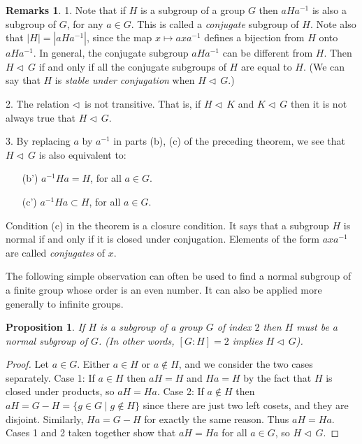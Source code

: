 \documentclass[11pt]{article}
\newtheorem{prop}[thm]{Proposition}
\theoremstyle{definition}
\newtheorem{rmks}[thm]{Remarks}
\newcommand{\normal}{\triangleleft\,}%
\begin{document}
\begin{rmks}
  1. Note that if $H$ is a subgroup of a group $G$ then $aHa^{-1}$ is
  also a subgroup of $G$, for any $a \in G$. This is called a
  \emph{conjugate} subgroup of $H$. Note also that $|H| = |aHa^{-1}|$,
  since the map $x \mapsto axa^{-1}$ defines a bijection from $H$ onto
  $aHa^{-1}$. In general, the conjugate subgroup $aHa^{-1}$ can be
  different from $H$. Then $H \normal G$ if and only if all the
  conjugate subgroups of $H$ are equal to $H$. (We can say that $H$ is
  \emph{stable under conjugation} when $H \normal G$.)

  2. The relation $\normal$ is not transitive. That is, if $H \normal
  K$ and $K \normal G$ then it is not always true that $H \normal G$.

  3. By replacing $a$ by $a^{-1}$ in parts (b), (c) of the preceding
  theorem, we see that $H \normal G$ is also equivalent to:
  \begin{enumerate}
  \item [(b')]  $a^{-1}Ha = H$, for all $a\in G$.
  \item [(c')]  $a^{-1}Ha \subset H$, for all $a\in G$.
  \end{enumerate}
  Condition (c) in the theorem is a closure condition. It says that a
  subgroup $H$ is normal if and only if it is closed under
  conjugation. Elements of the form $axa^{-1}$ are called
  \emph{conjugates} of $x$.
\end{rmks}

The following simple observation can often be used to find a normal
subgroup of a finite group whose order is an even number. It can also
be applied more generally to infinite groups.

\begin{prop}
  If $H$ is a subgroup of a group $G$ of index $2$ then $H$ must be a
  normal subgroup of $G$. (In other words, $[G:H]=2$ implies $H
  \normal G$).
\end{prop}

\begin{proof}
Let $a\in G$. Either $a \in H$ or $a \notin H$, and we consider the
two cases separately. Case 1: If $a\in H$ then $aH=H$ and $Ha=H$ by
the fact that $H$ is closed under products, so $aH=Ha$. Case 2: If
$a\notin H$ then $aH = G - H = \{ g \in G \mid g \notin H \}$ since
there are just two left cosets, and they are disjoint.  Similarly, $Ha
= G - H$ for exactly the same reason. Thus $aH=Ha$. Cases 1 and 2
taken together show that $aH=Ha$ for all $a \in G$, so $H \normal G$.
\end{proof}
 
\end{document}
